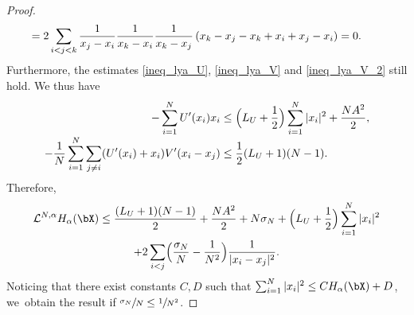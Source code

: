 \begin{proof}
\begin{align*}
&\hspace*{-.4cm}=2\sum_{i<j<k}\frac{1}{x_j-x_i}\frac{1}{x_k-x_i}\frac{1}{x_k-x_j}\left(x_k-x_j-x_k+x_i+x_j-x_i\right)=0.
\end{align*}
Furthermore, the estimates \eqref{ineq_lya_U}, \eqref{ineq_lya_V} and \eqref{ineq_lya_V_2} still hold. We thus have
\begin{align*}
-\sum_{i=1}^N U'(x_i)x_i&\leq\Bigl(L_U+\frac{1}{2}\Bigr)\sum_{i=1}^N|x_i|^2+\frac{NA^2}{2},\\[-3pt]
-\frac{1}{N}\sum_{i=1}^N\sum_{j\neq i}(U'(x_i)+x_i)V'(x_i-x_j)&\leq \frac{1}{2}(L_U+1)(N-1).
\end{align*}
Therefore,
\begin{multline*}
\mathcal{L}^{N,\alpha} H_\alpha(\bX)\leq \frac{(L_U+1)(N-1)}{2}+\frac{NA^2}{2}+N\sigma_N+\Bigl(L_U+\frac{1}{2}\Bigr)\sum_{i=1}^N|x_i|^2\\
+2\sum_{i<j}\Bigl(\frac{\sigma_N}{N}-\frac{1}{N^2}\Bigr)\frac{1}{|x_i-x_j|^2}.
\end{multline*}
Noticing that there exist constants $C,D$ such that $\sum_{i=1}^N|x_i|^2\leq CH_{\alpha}(\bX)+D$, we~obtain the result if $\sfrac{\sigma_N}{N}\leq\sfrac{1}{N^2}$.
\end{proof}

